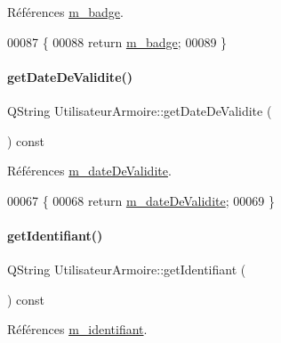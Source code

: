 Références \hyperlink{class_utilisateur_armoire_a1a3170a83da04d9f49816a98b226baeb}{m\+\_\+badge}.


\begin{DoxyCode}
00087 \{
00088     \textcolor{keywordflow}{return} \hyperlink{class_utilisateur_armoire_a1a3170a83da04d9f49816a98b226baeb}{m\_badge};
00089 \}
\end{DoxyCode}
\mbox{\label{class_utilisateur_armoire_a83c5fad292be7c94e38fc14a5feeae7f}} 
\paragraph{\texorpdfstring{get\+Date\+De\+Validite()}{getDateDeValidite()}}
{\footnotesize\ttfamily Q\+String Utilisateur\+Armoire\+::get\+Date\+De\+Validite (\begin{DoxyParamCaption}{ }\end{DoxyParamCaption}) const}



Références \hyperlink{class_utilisateur_armoire_a51bd81c78d69ea2699373d820bae31e4}{m\+\_\+date\+De\+Validite}.


\begin{DoxyCode}
00067 \{
00068     \textcolor{keywordflow}{return} \hyperlink{class_utilisateur_armoire_a51bd81c78d69ea2699373d820bae31e4}{m\_dateDeValidite};
00069 \}
\end{DoxyCode}
\mbox{\label{class_utilisateur_armoire_a1ba08f24dedbe82671ae4e2930748f31}} 
\paragraph{\texorpdfstring{get\+Identifiant()}{getIdentifiant()}}
{\footnotesize\ttfamily Q\+String Utilisateur\+Armoire\+::get\+Identifiant (\begin{DoxyParamCaption}{ }\end{DoxyParamCaption}) const}



Références \hyperlink{class_utilisateur_armoire_a30cb02e16dd9085a70c6b436781bb756}{m\+\_\+identifiant}.


